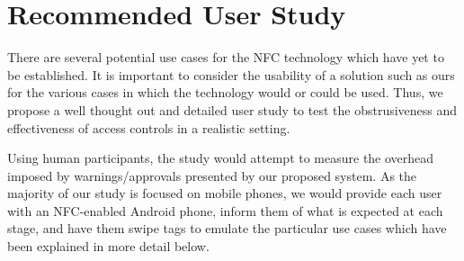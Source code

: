 \documentclass[12pt]{article}
\begin{document}


\section{Recommended User Study}
There are several potential use cases for the NFC technology which have yet to be established. It is important to consider the usability of a solution such as ours for the various cases in which the technology would or could be used. Thus, we propose a well thought out and detailed user study to test the obstrusiveness and effectiveness of access controls in a realistic setting. 

Using human participants, the study would attempt to measure the overhead imposed by warnings/approvals presented by our proposed system. As the majority of our study is focused on mobile phones, we would provide each user with an NFC-enabled Android phone, inform them of what is expected at each stage, and have them swipe tags to emulate the particular use cases which have been explained in more detail below.
\end{document}
